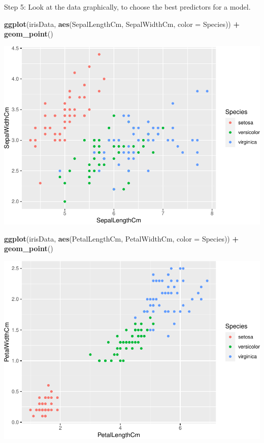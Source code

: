 \documentclass[
]{article}
\newenvironment{Shaded}{\begin{snugshade}}{\end{snugshade}}
\newcommand{\AttributeTok}[1]{\textcolor[rgb]{0.13,0.29,0.53}{#1}}
\newcommand{\FunctionTok}[1]{\textcolor[rgb]{0.13,0.29,0.53}{\textbf{#1}}}
\newcommand{\NormalTok}[1]{#1}
\newcommand{\SpecialCharTok}[1]{\textcolor[rgb]{0.81,0.36,0.00}{\textbf{#1}}}
\begin{document}
Step 5: Look at the data graphically, to choose the best predictors for
a model.

\begin{Shaded}
\begin{Highlighting}[]
\FunctionTok{ggplot}\NormalTok{(irisData, }\FunctionTok{aes}\NormalTok{(SepalLengthCm, SepalWidthCm, }\AttributeTok{color =}\NormalTok{ Species)) }\SpecialCharTok{+} \FunctionTok{geom\_point}\NormalTok{()}
\end{Highlighting}
\end{Shaded}

\includegraphics{nn_class_caret_tune_files/figure-latex/unnamed-chunk-5-1.pdf}

\begin{Shaded}
\begin{Highlighting}[]
\FunctionTok{ggplot}\NormalTok{(irisData, }\FunctionTok{aes}\NormalTok{(PetalLengthCm, PetalWidthCm, }\AttributeTok{color =}\NormalTok{ Species)) }\SpecialCharTok{+} \FunctionTok{geom\_point}\NormalTok{()}
\end{Highlighting}
\end{Shaded}

\includegraphics{nn_class_caret_tune_files/figure-latex/unnamed-chunk-5-2.pdf}
\end{document}
